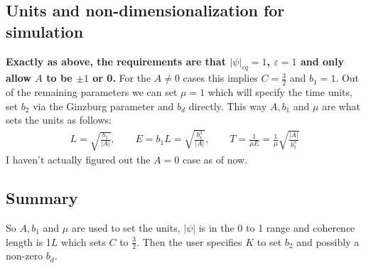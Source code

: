\documentclass[11pt]{article}
\begin{document}
\subsection{Units and non-dimensionalization for simulation}
\textbf{Exactly as above, the requirements are that $|\psi|_{eq} = 1$, $\varepsilon = 1$ and only allow $A$ to be $\pm 1$ or 0.}
For the $A \neq 0$ cases this implies $C = \frac{3}{2}$ and $b_1 = 1$.
Out of the remaining parameters we can set $\mu = 1$ which will specify the time units, set $b_2$ via the Ginzburg parameter and $b_d$ directly.
This way $A, b_1$ and $\mu$ are what sets the units as follows:
\begin{align}
    L = \sqrt{\frac{b_1}{|A|}}, \quad\quad E = b_1 L = \sqrt{\frac{b_1^3}{|A|}}, \quad\quad T = \frac{1}{\mu E} = \frac{1}{\mu} \sqrt{\frac{|A|}{b_1^3}}
\end{align}
I haven't actually figured out the $A=0$ case as of now.

\subsection{Summary}
So $A, b_1$ and $\mu$ are used to set the units, $|\psi|$ is in the 0 to 1 range and coherence length is 1$L$ which sets $C$ to $\frac{3}{2}$.
Then the user specifies $K$ to set $b_2$ and possibly a non-zero $b_d$.
\end{document}
